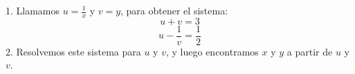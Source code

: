 \documentclass[spanish, 11pt]{exam}
\begin{document}
\begin{questions}







\begin{solution}
1. Llamamos \(u = \frac{1}{x}\) y \(v = y\), para obtener el sistema:
   \[
   u + v = 3
   \]
   \[
   u - \frac{1}{v} = \frac{1}{2}
   \]
2. Resolvemos este sistema para \(u\) y \(v\), y luego encontramos \(x\) y \(y\) a partir de \(u\) y \(v\).
\end{solution}




\end{questions}
\end{document}
